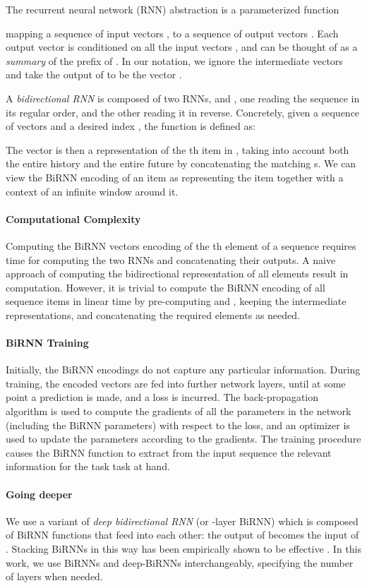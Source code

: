 \documentclass[11pt]{article}
\begin{document}
The recurrent neural network (RNN) abstraction is a parameterized function

mapping a sequence of  input vectors ,  to a
sequence of  output vectors .  Each output vector  is conditioned
on all the input vectors , and can be thought of as a \emph{summary} of
the prefix  of .  In our notation, we ignore the intermediate
vectors  and take the output of  to
be the vector .

A \emph{bidirectional RNN} is composed of two RNNs,  and
, one
reading the sequence in its regular order, and the other reading it in reverse.
Concretely, given a sequence of vectors  and a desired index , the function
 is defined as:

The vector  is then a representation of the th item
in , taking into account both the entire history  and the
entire future  by concatenating the matching s.  We can view the BiRNN encoding of an item  as
representing the item  together with a context of an infinite window around
it.

\paragraph{Computational Complexity}
Computing the BiRNN vectors encoding of the th element of a sequence
 requires  time for computing the two RNNs and concatenating
their outputs.  A naive approach of computing the bidirectional
representation of all  elements result in  computation.
However, it is trivial to compute the BiRNN encoding of all sequence items in
linear time by pre-computing  and
, keeping the intermediate representations, and
concatenating the required elements as needed.

\paragraph{BiRNN Training}
Initially, the BiRNN encodings  do not capture any particular information.
During training, the encoded vectors  are fed into further network layers,
until at some point a prediction is made, and a loss is incurred. The
back-propagation algorithm is used to compute the gradients of all the
parameters in the network (including the BiRNN parameters) with respect to the
loss, and an optimizer is used to update the parameters according to the
gradients. The training procedure causes the BiRNN function to extract from the
input sequence  the relevant information for the task task at hand.

\paragraph{Going deeper}
We use a variant of \emph{deep bidirectional RNN} (or -layer BiRNN) which is composed of  BiRNN functions
 that feed into each other: the output
 of  becomes the input of .  Stacking BiRNNs in this way has been empirically shown to be effective \cite{irsoy2014opinion}.  
In this work, we use
BiRNNs and deep-BiRNNs interchangeably, specifying the number of layers when needed.
\end{document}

